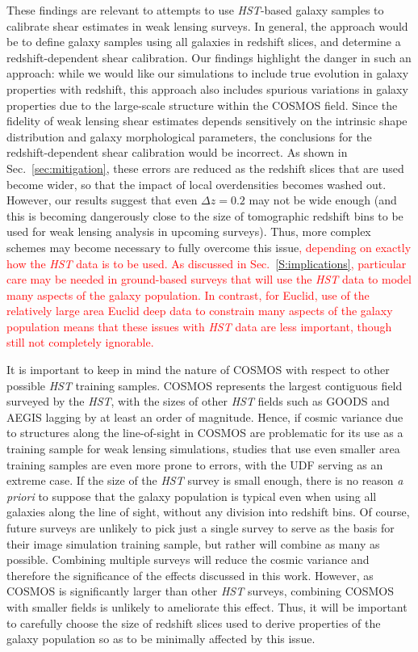 \documentclass[twocolumn,useAMS,usenatbib]{mn2e}
\newcommand{\rachel}[1]{{\textcolor{red}{#1}}}
\begin{document}
These findings are relevant to attempts to use {\em HST}-based galaxy
samples to calibrate shear estimates in weak lensing surveys.  In
general, the approach would be to define galaxy samples using all
galaxies in redshift slices, and determine a redshift-dependent shear
calibration.  Our findings highlight the danger in such an approach:
while we would like our simulations to include true evolution in
galaxy properties with redshift, this approach also includes spurious
variations in galaxy properties due to the large-scale structure
within the COSMOS field.  Since the fidelity of weak lensing shear
estimates depends sensitively on the intrinsic shape distribution and
galaxy morphological parameters, the conclusions for the
redshift-dependent shear calibration would be incorrect.  As shown in
Sec.~\ref{sec:mitigation}, these errors
are reduced as the redshift slices that are used become wider, so
that the impact of local overdensities becomes washed out.  However,
our results suggest that even $\Delta z=0.2$ may not be wide enough
(and this is becoming dangerously close to the size of tomographic
redshift bins to be used for weak lensing analysis in upcoming
surveys).  Thus, more complex schemes may become necessary to fully
overcome this issue\rachel{, depending on exactly how the {\em HST}
  data is to be used.  As discussed in Sec.~\ref{S:implications},
  particular care may be needed in ground-based surveys that will use
  the {\em HST} data to model many aspects of the galaxy population.
  In contrast,  for Euclid, use of the relatively large area Euclid deep
  data to constrain many aspects of the galaxy population means that
  these issues with {\em HST} data are less important, though still
  not completely ignorable.}

It is important to keep in mind the nature of COSMOS with respect to
other possible {\em HST} training samples.  COSMOS represents the
largest contiguous field surveyed by the {\em HST}, with the sizes of
other {\em HST} fields such as GOODS and AEGIS lagging by at least an
order of magnitude.  Hence, if cosmic variance due to structures along
the line-of-sight in COSMOS are problematic for its use as a training
sample for weak lensing simulations, studies that use even smaller
area training samples are even more prone to errors, with the UDF
serving as an extreme case.  If the size of the {\em HST} survey is
small enough, there is no reason {\em a priori} to suppose that the
galaxy population is typical even when using all galaxies along the
line of sight, without any division into redshift bins.  Of course,
future surveys are unlikely to pick just a single survey to serve as
the basis for their image simulation training sample, but rather
will combine as many as possible.  Combining multiple surveys will
reduce the cosmic variance and therefore the significance of the
effects discussed in this work.
However, as COSMOS is significantly larger than other \emph{HST} surveys, combining COSMOS with smaller fields is unlikely to ameliorate this effect.
Thus, it will be important to carefully choose the size of redshift slices used to
derive properties of the galaxy population so as to be minimally
affected by this issue.
\end{document}
